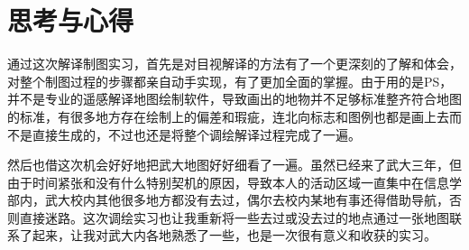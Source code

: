 \documentclass{ctexart}
\begin{document}
\section{思考与心得}

通过这次解译制图实习，首先是对目视解译的方法有了一个更深刻的了解和体会，对整个制图过程的步骤都亲自动手实现，有了更加全面的掌握。由于用的是PS，并不是专业的遥感解译地图绘制软件，导致画出的地物并不足够标准整齐符合地图的标准，有很多地方存在绘制上的偏差和瑕疵，连北向标志和图例也都是画上去而不是直接生成的，不过也还是将整个调绘解译过程完成了一遍。

然后也借这次机会好好地把武大地图好好细看了一遍。虽然已经来了武大三年，但由于时间紧张和没有什么特别契机的原因，导致本人的活动区域一直集中在信息学部内，武大校内其他很多地方都没有去过，偶尔去校内某地有事还得借助导航，否则直接迷路。这次调绘实习也让我重新将一些去过或没去过的地点通过一张地图联系了起来，让我对武大内各地熟悉了一些，也是一次很有意义和收获的实习。
\end{document}
